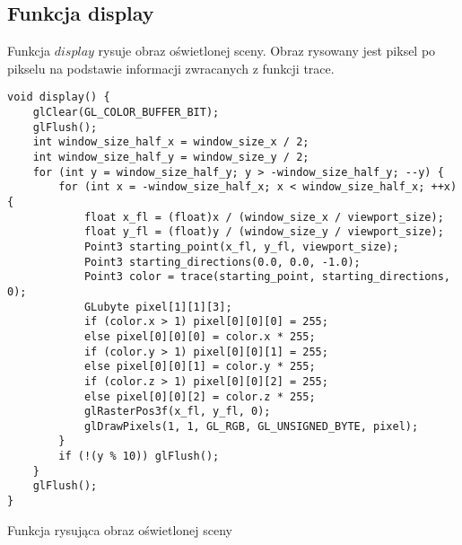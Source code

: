 \documentclass[11pt,a4paper,titlepage]{article}
\newenvironment{longlisting}{\captionsetup{type=listing}}{}
\begin{document}
\subsection{Funkcja display}
Funkcja $display$ rysuje obraz oświetlonej sceny. Obraz rysowany jest piksel po pikselu na podstawie informacji zwracanych z funkcji trace.
\begin{longlisting}
\begin{verbatim}
void display() {
	glClear(GL_COLOR_BUFFER_BIT);
	glFlush();
	int window_size_half_x = window_size_x / 2;
	int window_size_half_y = window_size_y / 2;
	for (int y = window_size_half_y; y > -window_size_half_y; --y) {
	    for (int x = -window_size_half_x; x < window_size_half_x; ++x) {
			float x_fl = (float)x / (window_size_x / viewport_size);
			float y_fl = (float)y / (window_size_y / viewport_size);
			Point3 starting_point(x_fl, y_fl, viewport_size);
			Point3 starting_directions(0.0, 0.0, -1.0);
			Point3 color = trace(starting_point, starting_directions, 0);
			GLubyte pixel[1][1][3];
			if (color.x > 1) pixel[0][0][0] = 255;
			else pixel[0][0][0] = color.x * 255;
			if (color.y > 1) pixel[0][0][1] = 255;
			else pixel[0][0][1] = color.y * 255;
			if (color.z > 1) pixel[0][0][2] = 255;
			else pixel[0][0][2] = color.z * 255;
			glRasterPos3f(x_fl, y_fl, 0);
			glDrawPixels(1, 1, GL_RGB, GL_UNSIGNED_BYTE, pixel);
		}
		if (!(y % 10)) glFlush();
	}
	glFlush();
}
\end{verbatim}
\caption{Funkcja rysująca obraz oświetlonej sceny}
\end{longlisting}
\end{document}
